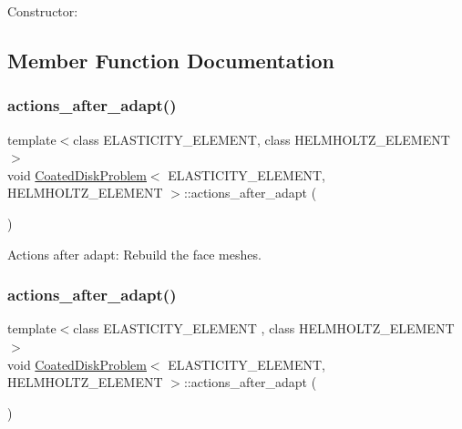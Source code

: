 Constructor\+: 



\subsection{Member Function Documentation}
\mbox{\label{classCoatedDiskProblem_a93f9d34cd24f08ca1ec726ae0057b939}} 
\subsubsection{\texorpdfstring{actions\+\_\+after\+\_\+adapt()}{actions\_after\_adapt()}\hspace{0.1cm}{\footnotesize\ttfamily [1/2]}}
{\footnotesize\ttfamily template$<$class E\+L\+A\+S\+T\+I\+C\+I\+T\+Y\+\_\+\+E\+L\+E\+M\+E\+NT, class H\+E\+L\+M\+H\+O\+L\+T\+Z\+\_\+\+E\+L\+E\+M\+E\+NT$>$ \\
void \hyperlink{classCoatedDiskProblem}{Coated\+Disk\+Problem}$<$ E\+L\+A\+S\+T\+I\+C\+I\+T\+Y\+\_\+\+E\+L\+E\+M\+E\+NT, H\+E\+L\+M\+H\+O\+L\+T\+Z\+\_\+\+E\+L\+E\+M\+E\+NT $>$\+::actions\+\_\+after\+\_\+adapt (\begin{DoxyParamCaption}{ }\end{DoxyParamCaption})}



Actions after adapt\+: Rebuild the face meshes. 

\mbox{\label{classCoatedDiskProblem_a93f9d34cd24f08ca1ec726ae0057b939}} 
\subsubsection{\texorpdfstring{actions\+\_\+after\+\_\+adapt()}{actions\_after\_adapt()}\hspace{0.1cm}{\footnotesize\ttfamily [2/2]}}
{\footnotesize\ttfamily template$<$class E\+L\+A\+S\+T\+I\+C\+I\+T\+Y\+\_\+\+E\+L\+E\+M\+E\+NT , class H\+E\+L\+M\+H\+O\+L\+T\+Z\+\_\+\+E\+L\+E\+M\+E\+NT $>$ \\
void \hyperlink{classCoatedDiskProblem}{Coated\+Disk\+Problem}$<$ E\+L\+A\+S\+T\+I\+C\+I\+T\+Y\+\_\+\+E\+L\+E\+M\+E\+NT, H\+E\+L\+M\+H\+O\+L\+T\+Z\+\_\+\+E\+L\+E\+M\+E\+NT $>$\+::actions\+\_\+after\+\_\+adapt (\begin{DoxyParamCaption}{ }\end{DoxyParamCaption})}



